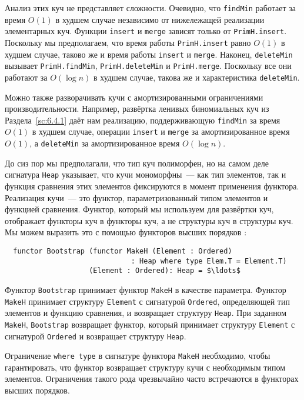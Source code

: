 Анализ этих куч не представляет сложности. Очевидно, что
\lstinline!findMin! работает за время $O(1)$ в худшем случае
независимо от нижележащей реализации элементарных куч. Функции
\lstinline!insert! и \lstinline!merge! зависят только от
\lstinline!PrimH.insert!.  Поскольку мы предполагаем, что время работы
\lstinline!PrimH.insert! равно $O(1)$ в худшем случае, таково же и
время работы \lstinline!insert! и \lstinline!merge!. Наконец, 
\lstinline!deleteMin! вызывает \lstinline!PrimH.findMin!,
\lstinline!PrimH.deleteMin! и \lstinline!PrimH.merge!. Поскольку все
они работают за $O(\log n)$ в худшем случае, такова же и
характеристика \lstinline!deleteMin!.

\begin{remark}
  Можно также разворачивать кучи с амортизированными ограничениями
  производительности. Например, развёртка ленивых биномиальных куч из
  Раздела~\ref{sc:6.4.1} даёт нам реализацию, поддерживающую
  \lstinline!findMin! за время $O(1)$ в худшем случае, операции
  \lstinline!insert! и \lstinline!merge! за амортизированное время
  $O(1)$, а \lstinline!deleteMin! за амортизированное время $O(\log n)$.
\end{remark}

До сиз пор мы предполагали, что тип куч полиморфен, но на самом деле
сигнатура \lstinline!Heap! указывает, что кучи мономорфны~--- как тип
элементов, так и функция сравнения этих элементов фиксируются в момент
применения функтора. Реализация кучи~--- это функтор,
параметризованный типом элементов и функцией сравнения. Функтор,
который мы используем для развёртки куч, отображает функторы куч в
функторы куч, а не структуры куч в структуры куч. Мы можем выразить
это с помощью функторов высших порядков \cite{MacQueenTofte1994}:
\begin{lstlisting}
  functor Bootstrap (functor MakeH (Element : Ordered)
                              : Heap where type Elem.T = Element.T)
                    (Element : Ordered): Heap = $\ldots$
\end{lstlisting}
Функтор \lstinline!Bootstrap! принимает функтор \lstinline!MakeH! в
качестве параметра. Функтор \lstinline!MakeH! принимает структуру
\lstinline!Element! с сигнатурой \lstinline!Ordered!, определяющей тип
элементов и функцию сравнения, и возвращает структуру
\lstinline!Heap!. При заданном \lstinline!MakeH!,
\lstinline!Bootstrap! возвращает функтор, который принимает структуру
\lstinline!Element! с сигнатурой \lstinline!Ordered! и возвращает
структуру \lstinline!Heap!.

\begin{remark}
  Ограничение \lstinline!where type! в сигнатуре функтора
  \lstinline!MakeH! необходимо, чтобы гарантировать, что функтор
  возвращает структуру кучи с необходимым типом элементов. Ограничения
  такого рода чрезвычайно часто встречаются в функторах высших порядков.
\end{remark}

